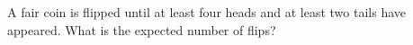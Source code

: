 A fair coin is flipped until at least four heads and at least two tails have appeared. What is the expected number of flips?
